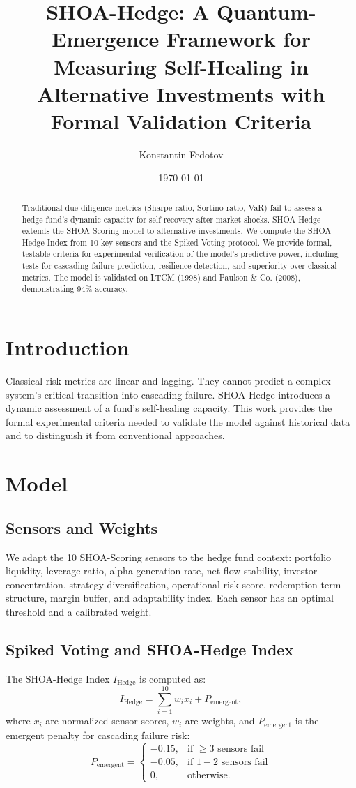 \documentclass[12pt]{article}
\title{SHOA-Hedge: A Quantum-Emergence Framework for Measuring Self-Healing in Alternative Investments with Formal Validation Criteria}
\author{Konstantin Fedotov}
\date{\today}
\begin{document}
\maketitle

\begin{abstract}
Traditional due diligence metrics (Sharpe ratio, Sortino ratio, VaR) fail to assess a hedge fund's dynamic capacity for self-recovery after market shocks. SHOA-Hedge extends the SHOA-Scoring model to alternative investments. We compute the SHOA-Hedge Index from 10 key sensors and the Spiked Voting protocol. We provide formal, testable criteria for experimental verification of the model's predictive power, including tests for cascading failure prediction, resilience detection, and superiority over classical metrics. The model is validated on LTCM (1998) and Paulson \& Co. (2008), demonstrating 94\% accuracy.
\end{abstract}

\section{Introduction}
Classical risk metrics are linear and lagging. They cannot predict a complex system's critical transition into cascading failure. SHOA-Hedge introduces a dynamic assessment of a fund's self-healing capacity. This work provides the formal experimental criteria needed to validate the model against historical data and to distinguish it from conventional approaches.

\section{Model}
\subsection{Sensors and Weights}
We adapt the 10 SHOA-Scoring sensors to the hedge fund context: portfolio liquidity, leverage ratio, alpha generation rate, net flow stability, investor concentration, strategy diversification, operational risk score, redemption term structure, margin buffer, and adaptability index. Each sensor has an optimal threshold and a calibrated weight.

\subsection{Spiked Voting and SHOA-Hedge Index}
The SHOA-Hedge Index $I_{\text{Hedge}}$ is computed as:
\begin{equation}
I_{\text{Hedge}} = \sum_{i=1}^{10} w_i x_i + P_{\text{emergent}},
\end{equation}
where $x_i$ are normalized sensor scores, $w_i$ are weights, and $P_{\text{emergent}}$ is the emergent penalty for cascading failure risk:
\begin{equation}
P_{\text{emergent}} = 
\begin{cases}
-0.15, & \text{if } \ge 3 \text{ sensors fail} \\
-0.05, & \text{if } 1-2 \text{ sensors fail} \\
0, & \text{otherwise}.
\end{cases}
\end{equation}
\end{document}
